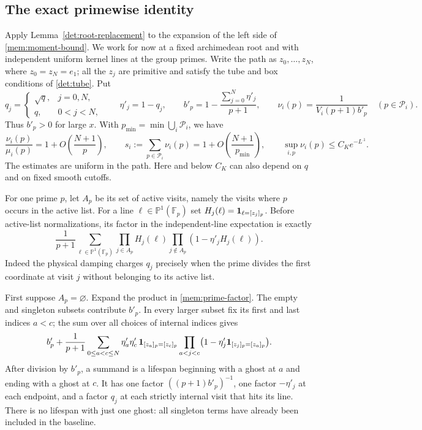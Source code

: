 \subsection{The exact primewise identity}

Apply Lemma~\ref{det:root-replacement} to the expansion
of the left side of \eqref{mem:moment-bound}. We work for now at a fixed
archimedean root and with independent uniform kernel lines at the group
primes. Write the path as $z_0,\ldots,z_N$, where $z_0=z_N=e_1$;
all the $z_j$ are primitive and satisfy the tube and box conditions of
\eqref{det:tube}. Put
\begin{equation}\label{mem:baseline}
 q_j=\begin{cases}\sqrt q,&j=0,N,\\q,&0<j<N,\end{cases}
 \qquad \eta'_j=1-q_j,\qquad
 b'_p=1-\frac{\sum_{j=0}^N\eta'_j}{p+1},\qquad
 \nu_i(p)=\frac{1}{V_i(p+1)b'_p}\quad(p\in\mathcal P_i).
\end{equation}
Thus $b'_p>0$ for large $x$. With
$p_{\min}=\min\bigcup_i\mathcal P_i$, we have
\begin{equation}\label{mem:measure-masses}
 \frac{\nu_i(p)}{\mu_i(p)}=1+O\!\left(\frac{N+1}{p}\right),\qquad
 s_i:=\sum_{p\in\mathcal P_i}\nu_i(p)
       =1+O\!\left(\frac{N+1}{p_{\min}}\right),\qquad
 \sup_{i,p}\nu_i(p)\le C_K e^{-L^{.1}}.
\end{equation}
The estimates are uniform in the path. Here and below $C_K$ can also
depend on $q$ and on fixed smooth cutoffs.

For one prime $p$, let $A_p$ be its set of active visits, namely the
visits where $p$ occurs in the active list. For a line
$\ell\in\mathbb P^1(\mathbb F_p)$ set
$H_j(\ell)=\mathbf{1}_{\ell=[z_j]_p}$. Before active-list normalizations, its
factor in the independent-line expectation is exactly
\begin{equation}\label{mem:prime-factor}
 \frac{1}{p+1}\sum_{\ell\in\mathbb P^1(\mathbb F_p)}
 \prod_{j\in A_p}H_j(\ell)
 \prod_{j\notin A_p}(1-\eta'_j H_j(\ell)).
\end{equation}
Indeed the physical damping charges $q_j$ precisely when the prime
divides the first coordinate at visit $j$ without belonging to its
active list.

First suppose $A_p=\varnothing$. Expand the product in
\eqref{mem:prime-factor}. The empty and singleton subsets contribute
$b'_p$. In every larger subset fix its first and last indices $a<c$;
the sum over all choices of internal indices gives
\begin{equation}\label{mem:orphan-identity}
 b'_p+\frac{1}{p+1}\sum_{0\le a<c\le N}
 \eta'_a\eta'_c\,\mathbf{1}_{[z_a]_p=[z_c]_p}
 \prod_{a<j<c}\bigl(1-\eta'_j\mathbf{1}_{[z_j]_p=[z_a]_p}\bigr).
\end{equation}
After division by $b'_p$, a summand is a lifespan beginning with a
ghost at $a$ and ending with a ghost at $c$. It has one factor
$((p+1)b'_p)^{-1}$, one factor $-\eta'_j$ at each endpoint, and a
factor $q_j$ at each strictly internal visit that hits its line.
There is no lifespan with just one ghost: all singleton terms have
already been included in the baseline.

